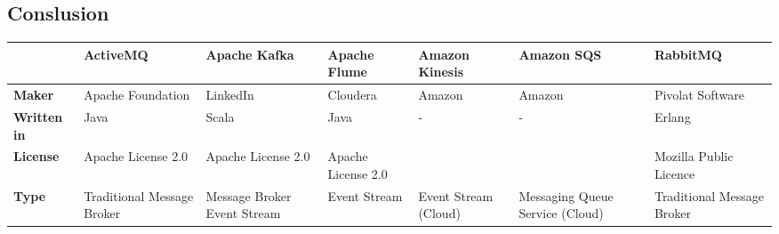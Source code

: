 \begin{landscape}
\section{Conslusion}


\begin{table}[h]
    \begin{tabular}{|p{3cm}|p{3cm}|p{3cm}|p{3cm}|l|l|l|}
        \hline
                                                                 & \textbf{ActiveMQ}                                 & \textbf{Apache Kafka}                              & \textbf{Apache Flume}                   & \textbf{Amazon Kinesis}                   & \textbf{Amazon SQS}                                     & \textbf{RabbitMQ}                               \\ \hline
        \multicolumn{1}{|l|}{\textbf{Maker}}                     & \multicolumn{1}{l|}{Apache Foundation}            & \multicolumn{1}{l|}{LinkedIn}                      & \multicolumn{1}{l|}{Cloudera}           & \multicolumn{1}{l|}{Amazon}               & \multicolumn{1}{l|}{Amazon}                             & \multicolumn{1}{l|}{Pivolat Software}           \\ \hline
        \multicolumn{1}{|l|}{\textbf{Written in}}                & \multicolumn{1}{l|}{Java}                         & \multicolumn{1}{l|}{Scala}                         & \multicolumn{1}{l|}{Java}               & \multicolumn{1}{l|}{-}                    & \multicolumn{1}{l|}{-}                                  & \multicolumn{1}{l|}{Erlang}                     \\ \hline
        \multicolumn{1}{|l|}{\textbf{License}}                   & \multicolumn{1}{l|}{Apache License 2.0}           & \multicolumn{1}{l|}{Apache License 2.0}            & \multicolumn{1}{l|}{Apache License 2.0} & \multicolumn{1}{l|}{}                     & \multicolumn{1}{l|}{}                                   & \multicolumn{1}{l|}{Mozilla Public Licence}     \\ \hline
        \multicolumn{1}{|l|}{\textbf{Type}}                      & \multicolumn{1}{l|}{Traditional Message Broker}   & \multicolumn{1}{l|}{Message Broker Event Stream} & \multicolumn{1}{l|}{Event Stream}       & \multicolumn{1}{l|}{Event Stream (Cloud)} & \multicolumn{1}{l|}{Messaging Queue Service (Cloud)}    & \multicolumn{1}{l|}{Traditional Message Broker} \\ \hline

\end{tabular}
\end{table}
\end{landscape}

